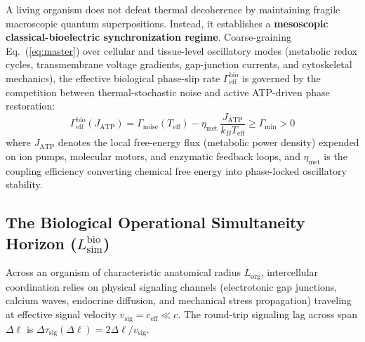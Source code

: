 \documentclass[11pt,a4paper]{article}
\begin{document}
A living organism does not defeat thermal decoherence by maintaining fragile macroscopic quantum superpositions. Instead, it establishes a \textbf{mesoscopic classical-bioelectric synchronization regime}. Coarse-graining Eq.~(\ref{eq:master}) over cellular and tissue-level oscillatory modes (metabolic redox cycles, transmembrane voltage gradients, gap-junction currents, and cytoskeletal mechanics), the effective biological phase-slip rate $\Gamma_{\mathrm{eff}}^{\mathrm{bio}}$ is governed by the competition between thermal-stochastic noise and active ATP-driven phase restoration:
\begin{equation}
\Gamma_{\mathrm{eff}}^{\mathrm{bio}}(J_{\mathrm{ATP}}) = \Gamma_{\mathrm{noise}}(T_{\mathrm{eff}}) - \eta_{\mathrm{met}}\,\frac{J_{\mathrm{ATP}}}{k_B T_{\mathrm{eff}}} \ge \Gamma_{\mathrm{min}} > 0
\label{eq:gamma_bio}
\end{equation}
where $J_{\mathrm{ATP}}$ denotes the local free-energy flux (metabolic power density) expended on ion pumps, molecular motors, and enzymatic feedback loops, and $\eta_{\mathrm{met}}$ is the coupling efficiency converting chemical free energy into phase-locked oscillatory stability.

\subsection{The Biological Operational Simultaneity Horizon ($L_{\mathrm{sim}}^{\mathrm{bio}}$)}

Across an organism of characteristic anatomical radius $L_{\mathrm{org}}$, intercellular coordination relies on physical signaling channels (electrotonic gap junctions, calcium waves, endocrine diffusion, and mechanical stress propagation) traveling at effective signal velocity $v_{\mathrm{sig}} = c_{\mathrm{eff}} \ll c$. The round-trip signaling lag across span $\Delta\ell$ is $\Delta\tau_{\mathrm{sig}}(\Delta\ell) = 2\Delta\ell / v_{\mathrm{sig}}$.
\end{document}
